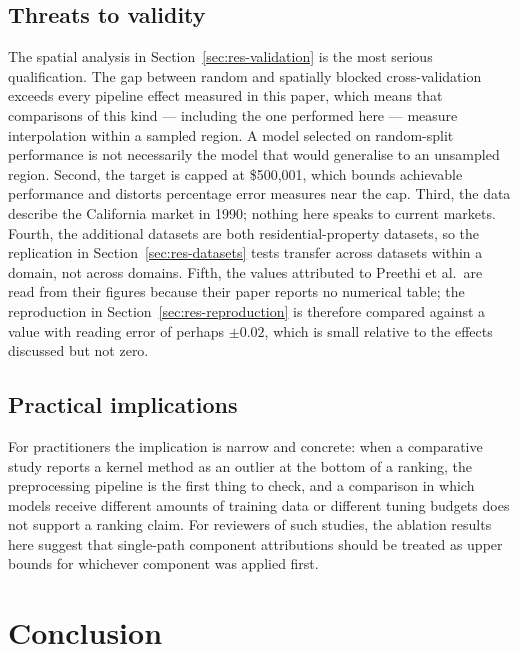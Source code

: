 \documentclass[pdflatex,sn-mathphys-num]{sn-jnl}
\begin{document}
\subsection{Threats to validity}\label{sec:disc-threats}
The spatial analysis in Section~\ref{sec:res-validation} is the most serious qualification. The gap between random and spatially blocked cross-validation exceeds every pipeline effect measured in this paper, which means that comparisons of this kind --- including the one performed here --- measure interpolation within a sampled region. A model selected on random-split performance is not necessarily the model that would generalise to an unsampled region. Second, the target is capped at \$500{,}001, which bounds achievable performance and distorts percentage error measures near the cap. Third, the data describe the California market in 1990; nothing here speaks to current markets. Fourth, the additional datasets are both residential-property datasets, so the replication in Section~\ref{sec:res-datasets} tests transfer across datasets within a domain, not across domains. Fifth, the values attributed to Preethi et al.\ are read from their figures because their paper reports no numerical table; the reproduction in Section~\ref{sec:res-reproduction} is therefore compared against a value with reading error of perhaps $\pm 0.02$, which is small relative to the effects discussed but not zero.

\subsection{Practical implications}
For practitioners the implication is narrow and concrete: when a comparative study reports a kernel method as an outlier at the bottom of a ranking, the preprocessing pipeline is the first thing to check, and a comparison in which models receive different amounts of training data or different tuning budgets does not support a ranking claim. For reviewers of such studies, the ablation results here suggest that single-path component attributions should be treated as upper bounds for whichever component was applied first.

\section{Conclusion}\label{sec:conclusion}
\end{document}
